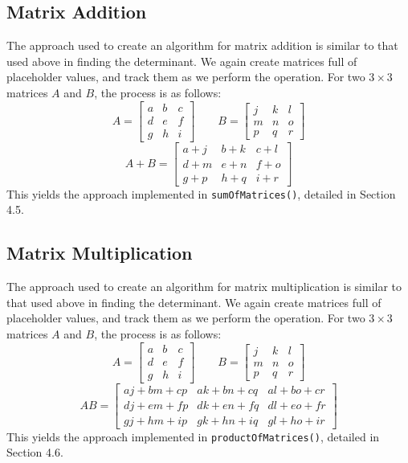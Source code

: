 \documentclass[12pt]{article}
\begin{document}
\subsection{Matrix Addition}
The approach used to create an algorithm for matrix addition is similar to that used above in finding the determinant. We again create matrices full of placeholder values, and track them as we perform the operation. For two $3\times3$ matrices $A$ and $B$, the process is as follows:
\[
A =
\begin{bmatrix}
    a & b & c \\
    d & e & f \\
    g & h & i
\end{bmatrix}
\qquad
B = 
\begin{bmatrix}
    j & k & l \\
    m & n & o \\
    p & q & r
\end{bmatrix}
\]
\begin{equation}
    A+B = 
    \begin{bmatrix}
    a + j & b + k & c + l \\
    d + m & e + n & f + o \\
    g + p & h + q & i + r
    \end{bmatrix}
\end{equation}
This yields the approach implemented in \texttt{sumOfMatrices()}, detailed in Section 4.5.

\subsection{Matrix Multiplication}
The approach used to create an algorithm for matrix multiplication is similar to that used above in finding the determinant. We again create matrices full of placeholder values, and track them as we perform the operation. For two $3\times3$ matrices $A$ and $B$, the process is as follows:
\[
A =
\begin{bmatrix}
    a & b & c \\
    d & e & f \\
    g & h & i
\end{bmatrix}
\qquad
B = 
\begin{bmatrix}
    j & k & l \\
    m & n & o \\
    p & q & r
\end{bmatrix}
\]
\begin{equation}
    AB = 
    \begin{bmatrix}
    a j + b m + c p & a k + b n + c q & a l + b o + c r \\
    d j + e m + f p & d k + e n + f q & d l + e o + f r \\
    g j + h m + i p & g k + h n + i q & g l + h o + i r
    \end{bmatrix}
\end{equation}
This yields the approach implemented in \texttt{productOfMatrices()}, detailed in Section 4.6.
\end{document}
